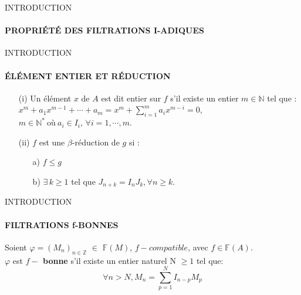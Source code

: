 \documentclass[11pt,a4paper]{beamer}
\begin{document}
\begin{frame}{INTRODUCTION}
	\framesubtitle{PROPRIÉTÉ DES FILTRATIONS I-ADIQUES}
	\begin{block}{}
	\begin{center}
\end{center}
	\end{block}
\end{frame}


\begin{frame}{INTRODUCTION}
	\framesubtitle{ÉLÉMENT ENTIER ET RÉDUCTION}
	\begin{block}{}
		\begin{enumerate}
			\item[(i)] Un élément $x$ de $A$ est dit entier sur $f$ s'il existe un entier $m \in \mathbb{N}$ tel que : $x^m + a_1 x^{m-1} + \cdots + a_m = x^m + \sum_{i=1}^{m} a_i x^{m-i} = 0,$\\$ m \in \mathbb{N^*} \ \text{où} \ a_i \in I_i,\, \forall i=1, \cdots ,m.$
			\item[(ii)] $f$ est une $\beta$-réduction de $g$ si : \\
			\begin{enumerate}
				\item[a)] $f \leq g$
				\item[b)]  $\exists \, k \geq 1$ tel que $J_{n+k} = I_n J_k , \forall n \geq k$.
			\end{enumerate}
		\end{enumerate}
	\end{block}
\end{frame}

\begin{frame}{INTRODUCTION}
	\framesubtitle{FILTRATIONS f-BONNES}
	\begin{block}{}
			Soient $\varphi=(M_n)_{n \in \mathbb{Z}}$ $\in$ $\mathbb{F}(M)$, $f-compatible$, avec $f \in \mathbb{F}(A)$.\\
			$\varphi$ est \textbf{$f-$ bonne} s'il existe un entier naturel N $\geqslant 1$ tel que:
				\[\forall n > N, M_{n}=\sum_{p=1}^{N}I_{n-p}M_{p} \]
	\end{block}
\end{frame}
\end{document}
